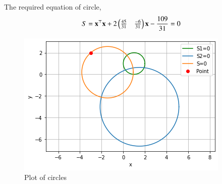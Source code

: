 The required equation of circle,
\begin{align}
    S = \mathbf{x}^\top\mathbf{x} + 2\begin{pmatrix}\frac{45}{31}&\frac{-6}{31}\end{pmatrix}\mathbf{x} - \frac{109}{31} = 0
\end{align}
\begin{figure}[h!]
\centering
\includegraphics[width=\columnwidth]{solutions/4/4/3/figures/circles.png}
\caption{Plot of circles}
\label{4/4/3/fig:circles plot}
\end{figure}
